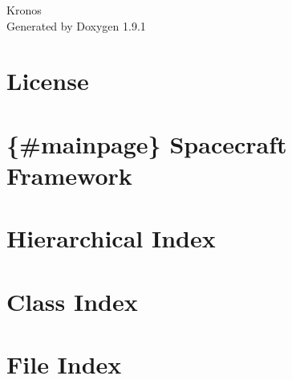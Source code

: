 \let\mypdfximage\pdfximage\def\pdfximage{\immediate\mypdfximage}\documentclass[twoside]{book}
\newcommand{\+}{\discretionary{\mbox{\scriptsize$\hookleftarrow$}}{}{}}
\newcommand{\clearemptydoublepage}{%
  \newpage{\pagestyle{empty}\cleardoublepage}%
}
\begin{document}
\raggedbottom

\hypersetup{pageanchor=false,
             bookmarksnumbered=true,
             pdfencoding=unicode
            }
\begin{titlepage}
\vspace*{7cm}
\begin{center}%
{\Large Kronos }\\
\vspace*{1cm}
{\large Generated by Doxygen 1.9.1}\\
\end{center}
\end{titlepage}
\clearemptydoublepage
{}
\tableofcontents
\clearemptydoublepage
{}
\hypersetup{pageanchor=true}

\chapter{License}
\label{License}

\chapter{\{\#mainpage\} Spacecraft Framework}
\label{md__home_thomas_Repos_orthus_fsw_kronos_lib_include_index}

\chapter{Hierarchical Index}

\chapter{Class Index}

\chapter{File Index}

\end{document}
